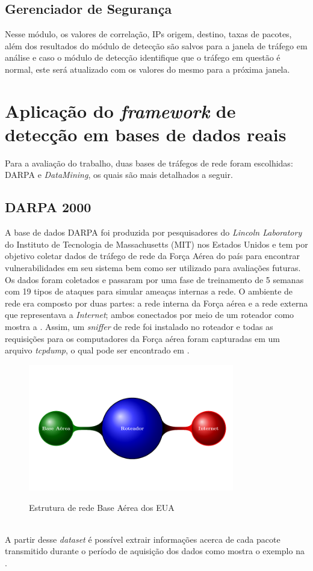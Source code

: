 \subsection{Gerenciador de Segurança}
Nesse módulo, os valores de correlação, IPs origem, destino, taxas de pacotes, além dos resultados do módulo de detecção são salvos para a janela de tráfego em análise e caso o módulo de detecção identifique que o tráfego em questão é normal, este será atualizado com os valores do mesmo para a próxima janela.

\section{Aplicação do \textit{framework} de detecção em bases de dados reais}
\label{Sec:NaHiD_VERC}
Para a avaliação do trabalho, duas bases de tráfegos de rede foram escolhidas: DARPA e  \textit{DataMining}, os quais são mais detalhados a seguir. 
\subsection{DARPA 2000}
 A base de dados DARPA foi produzida por pesquisadores do \textit{Lincoln Laboratory} do Instituto de Tecnologia de Massachusetts (MIT) nos Estados Unidos e tem por objetivo coletar dados de tráfego de rede da Força Aérea do país para encontrar vulnerabilidades em seu sistema bem como ser utilizado para avaliações futuras. Os dados foram coletados e passaram por uma fase de treinamento de 5 semanas com 19 tipos de ataques para simular ameaças internas a rede. O ambiente de rede era composto por duas partes: a rede interna da Força aérea e a rede externa que representava a \textit{Internet}; ambos conectados por meio de um roteador como mostra a .	Assim, um \textit{sniffer} de rede foi instalado no roteador e todas as requisições para os computadores da Força aérea foram capturadas em um arquivo \textit{tcpdump}, o qual pode ser encontrado em \cite{siteDarpa}. 
 \begin{figure}[ht]
 	\centering
	\caption{Estrutura de rede Base Aérea dos EUA }
		\includegraphics[width=0.8\textwidth]{figs/darpaStructure.pdf}
	\label{fig:DARPA_Estrututra}
\end{figure}
\\
A partir desse \textit{dataset} é possível extrair informações acerca de cada pacote transmitido durante o período de aquisição dos dados como mostra o exemplo na .

